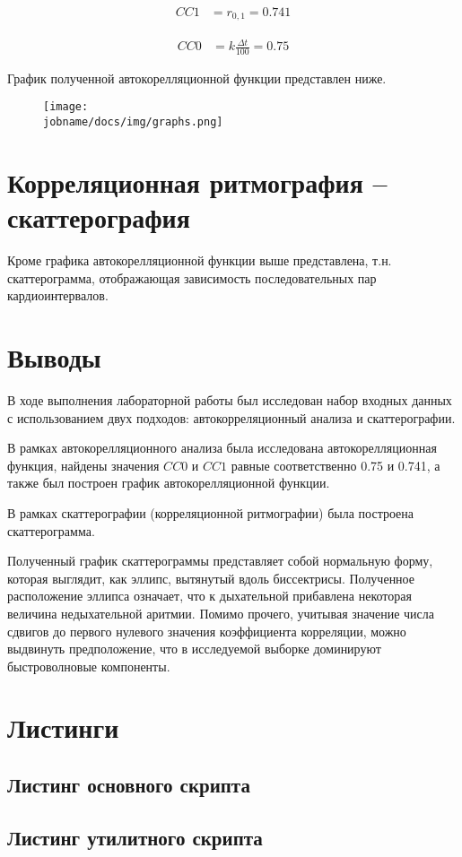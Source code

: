 \begin{align*}
    CC1 & = r_{0,1} = 0.741
\end{align*}

\begin{align*}
    CC0 & = k \frac{\Delta t}{100} = 0.75
\end{align*}

График полученной автокорелляционной функции представлен ниже.

\begin{figure}[h!]
    \centering
    \texttt{[image: \\jobname/docs/img/graphs.png]}
\end{figure}

\section*{Корреляционная ритмография – скаттерография}

Кроме графика автокорелляционной функции выше представлена, т.н. скаттерограмма, отображающая зависимость
последовательных пар кардиоинтервалов.

\clearpage

\section*{Выводы}

В ходе выполнения лабораторной работы был исследован набор входных данных с использованием двух подходов:
автокорреляционный анализа и скаттерографии.

В рамках автокорелляционного анализа была исследована автокорелляционная функция, найдены значения
$CC0$ и $CC1$ равные соответственно 0.75 и 0.741, а также был построен график автокорелляционной функции.

В рамках скаттерографии (корреляционной ритмографии) была построена скаттерограмма.

Полученный график скаттерограммы представляет собой нормальную форму, которая выглядит, как эллипс, вытянутый вдоль
биссектрисы.
Полученное расположение эллипса означает, что к дыхательной прибавлена некоторая величина недыхательной аритмии.
Помимо прочего, учитывая значение числа сдвигов до первого нулевого значения коэффициента корреляции, можно выдвинуть
предположение, что в исследуемой выборке доминируют быстроволновые компоненты.

\clearpage

\section*{Листинги}

\subsection*{Листинг основного скрипта}


\subsection*{Листинг утилитного скрипта}

